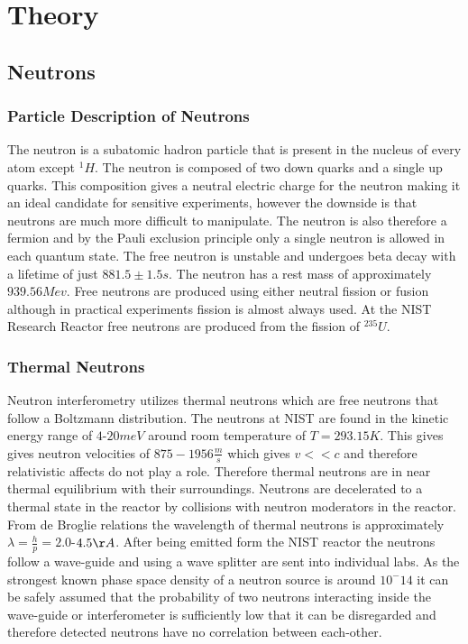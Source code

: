 
\chapter{Theory} %
\label{Chapter2}


\section{Neutrons}
\subsection{Particle Description of Neutrons}
The neutron is a subatomic hadron particle that is present in the nucleus of every atom except $^1H$. The neutron is composed of two down quarks and a single up quarks. This composition gives a neutral electric charge for the neutron making it an ideal candidate for sensitive experiments, however the downside is that neutrons are much more difficult to manipulate. The neutron is also therefore a fermion and by the Pauli exclusion principle only a single neutron is allowed in each quantum state. The free neutron is unstable and undergoes beta decay with a lifetime of just $881.5 \pm 1.5 s$. The neutron has a rest mass of approximately $939.56Mev$. Free neutrons are produced using either neutral fission or fusion although in practical experiments fission is almost always used. At the NIST Research Reactor free neutrons are produced from the fission of $^{235}U$.\cite{dimaThesis}
\subsection{Thermal Neutrons}
\label{sec:thermal}
Neutron interferometry utilizes thermal neutrons which are free neutrons that follow a Boltzmann distribution. The neutrons at NIST are found in the kinetic energy range of $4$-$20meV$ around room temperature of $T=293.15K$. This gives gives neutron velocities of $875-1956\frac{m}{s}$ which gives $v<<c$ and therefore relativistic affects do not play a role. Therefore thermal neutrons are in near thermal equilibrium with their surroundings. Neutrons are decelerated to a thermal state in the reactor by collisions with neutron moderators in the reactor. From de Broglie relations the wavelength of thermal neutrons is approximately $\lambda = \frac{h}{p}= 2.0$-$4.5\AA$. After being emitted form the NIST reactor the neutrons follow a wave-guide and using a wave splitter are sent into individual labs. As the strongest known phase space density of a neutron source is around $10^-14$ it can be safely assumed that the probability of two neutrons interacting inside the wave-guide or interferometer is sufficiently low that it can be disregarded and therefore detected neutrons have no correlation between each-other.\cite{dimaThesis}

